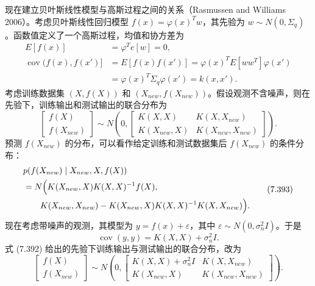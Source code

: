 现在建立贝叶斯线性模型与高斯过程之间的关系（Rasmussen and Williams 2006）。考虑贝叶斯线性回归模型 $f(x)=\varphi(x)^Tw$，其先验为 $w\sim N(0,\Sigma_q)$。函数值定义了一个高斯过程，均值和协方差为
\begin{equation}
\begin{aligned}
E[f(x)]&=\varphi^Te[w]=0,\\
\operatorname{cov}(f(x),f(x')]&=E[f(x)f(x')]=\varphi(x)^TE[ww^T]\varphi(x')\\
&=\varphi(x)^T\Sigma_q\varphi(x')=k(x,x').
\end{aligned}
\tag{7.391}
\end{equation}
考虑训练数据集 $(X,f(X))$ 和 $(X_{new},f(X_{new}))$。假设观测不含噪声，则在先验下，训练输出和测试输出的联合分布为
\begin{equation}
\begin{bmatrix}f(X)\\f(X_{new})\end{bmatrix}
\sim N\left(0,\begin{bmatrix}
K(X,X)&K(X,X_{new})\\
K(X_{new},X)&K(X_{new},X_{new})
\end{bmatrix}\right).
\tag{7.392}
\end{equation}
预测 $f(X_{new})$ 的分布，可以看作给定训练和测试数据集后 $f(X_{new})$ 的条件分布：
\begin{equation}
\begin{aligned}
&p(f(X_{new})\mid X_{new},X,f(X))\\
&=N\Bigl(K(X_{new},X)K(X,X)^{-1}f(X),\\
&\qquad K(X_{new},X_{new})-K(X_{new},X)K(X,X)^{-1}K(X,X_{new})\Bigr).
\end{aligned}
\tag{7.393}
\end{equation}
现在考虑带噪声的观测，其模型为 $y=f(x)+\varepsilon$，其中 $\varepsilon\sim N(0,\sigma_n^2I)$。于是
\begin{equation}
\operatorname{cov}(y,y)=K(X,X)+\sigma_n^2I.
\tag{7.394}
\end{equation}
式 (7.392) 给出的先验下训练输出与测试输出的联合分布，改为
\begin{equation}
\begin{bmatrix}f(X)\\f(X_{new})\end{bmatrix}
\sim N\left(0,\begin{bmatrix}
K(X,X)+\sigma_n^2I&K(X,X_{new})\\
K(X_{new},X)&K(X_{new},X_{new})
\end{bmatrix}\right).
\tag{7.395}
\end{equation}

